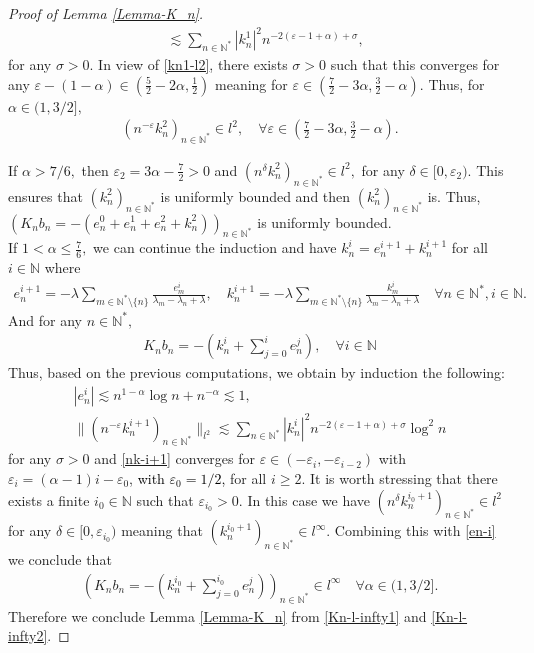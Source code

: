 \documentclass[11pt, dvipsnames]{amsart}
\begin{document}
{\begin{proof}[Proof of Lemma \ref{Lemma-K_n}]
\begin{align*}
    &\lesssim \sum_{n\in \mathbb{N}^*}|k_n^1|^2n^{-2(\varepsilon-1+\alpha)+\sigma},
\end{align*}
for any $\sigma>0$.
In view of \eqref{kn1-l2}, there exists $\sigma>0$ such that this converges for any $\varepsilon -(1-\alpha)\in \left(\frac{5}{2}-2\alpha,\frac{1}{2}\right)$ meaning for $\varepsilon\in \left(\frac{7}{2}-3\alpha,\frac{3}{2}-\alpha\right).$ Thus, for $\alpha\in (1,3/2],$
\begin{align*}
    (n^{-\varepsilon}k_n^2)_{n\in \mathbb{N}^*}\in l^2, \quad \forall \varepsilon\in \left(\frac{7}{2}-3\alpha,\frac{3}{2}-\alpha\right).
\end{align*}

If $\alpha > 7/6,$ then $\varepsilon_2=3\alpha-\frac{7}{2}>0$ and $(n^{\delta}k_n^2)_{n\in \mathbb{N}^*}\in l^2,$ for any $\delta\in [0,\varepsilon_2).$ This ensures that $(k_n^2)_{n\in \mathbb{N}^*}$ is uniformly bounded and then $(k_n^2)_{n\in \mathbb{N}^*}$ is. Thus, $\left(K_n b_n=-(e_n^0+e^1_n+e_n^2+k_n^2)\right)_{n\in \mathbb{N}^*}$ is uniformly bounded.\\

If $1<\alpha\leq \frac{7}{6},$ we can continue the induction and have
$k_n^i=e_n^{i+1}+k_n^{i+1}$ for all $i\in \mathbb{N}$ where
\begin{align*}
  e_n^{i+1}=  -\lambda\sum_{m\in \mathbb{N}^*\setminus\{n\}}\frac{e_m^i}{\lambda_m-\lambda_n+\lambda}, \quad k_n^{i+1}=-\lambda\sum_{m\in \mathbb{N}^*\setminus\{n\}}\frac{k_m^i}{\lambda_m-\lambda_n+\lambda} \quad \forall n\in \mathbb{N}^*, i\in \mathbb{N}.
\end{align*}
And for any $n\in \mathbb{N}^*,$
\begin{align*}
    K_n b_n=-\left(k_n^i+\sum_{j=0}^{i}e_n^j\right), \quad \forall i\in \mathbb{N}
\end{align*}
Thus, based on the previous computations, we obtain by induction the following:
\begin{align}
    |e_n^i|\lesssim n^{1-\alpha}\log n+n^{-\alpha}\lesssim 1,\label{en-i}\\
    \|(n^{-\varepsilon}k_n^{i+1})_{n\in \mathbb{N}^*}\|_{l^2}\lesssim \sum_{n\in \mathbb{N}^*}|k_n^i|^2n^{-2(\varepsilon-1+\alpha)+\sigma}\log^2 n\label{nk-i+1}
\end{align} for any $\sigma>0$ and \eqref{nk-i+1} converges for $\varepsilon\in (-\varepsilon_i,-\varepsilon_{i-2})$ with $\varepsilon_i=(\alpha-1)i-\varepsilon_0$, \textcolor{black}{with $\varepsilon_{0}=1/2$,} for all $i\geq 2.$ It is worth stressing that there exists a finite $i_0\in \mathbb{N}$ such that $\varepsilon_{i_0}>0.$ In this case we have $(n^{\delta}k_n^{i_0+1})_{n\in \mathbb{N}^*}\in l^2$ for any $\delta \in [0,\varepsilon_{i_0})$ meaning that $(k_n^{i_0+1})_{n\in \mathbb{N}^*}\in l^{\infty}.$ Combining this with \eqref{en-i} we conclude that 
\begin{align}
    \left(K_n b_n=-\left(k_n^{i_0}+\sum_{j=0}^{i_0}e_n^j\right)\right)_{n\in \mathbb{N}^*}\in l^{\infty}\quad \forall \alpha\in (1, 3/2]. \label{Kn-l-infty2}
\end{align}
Therefore we conclude Lemma \ref{Lemma-K_n} from \eqref{Kn-l-infty1} and \eqref{Kn-l-infty2}.
\end{proof}
}
\end{document}
